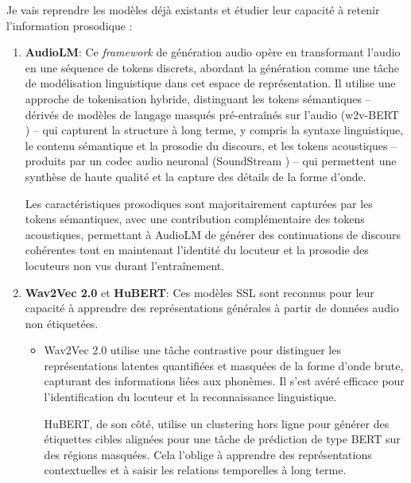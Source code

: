 \documentclass[11pt,a4paper]{article}
\begin{document}
Je vais reprendre les modèles déjà existants et étudier leur capacité à retenir l'information prosodique :
\begin{enumerate}
    \item \textbf{AudioLM}: Ce \textit{framework} de génération audio opère en transformant l'audio en une séquence de tokens discrets, abordant la génération comme une tâche de modélisation linguistique dans cet espace de représentation. Il utilise une approche de tokenisation hybride, distinguant les tokens sémantiques – dérivés de modèles de langage masqués pré-entraînés sur l'audio (w2v-BERT \cite{chung2021w2vbertcombiningcontrastivelearning}) – qui capturent la structure à long terme, y compris la syntaxe linguistique, le contenu sémantique et la prosodie du discours, et les tokens acoustiques – produits par un codec audio neuronal (SoundStream \cite{zeghidour2021soundstreamendtoendneuralaudio}) – qui permettent une synthèse de haute qualité et la capture des détails de la forme d'onde. \newline
    
    Les caractéristiques prosodiques sont majoritairement capturées par les tokens sémantiques, avec une contribution complémentaire des tokens acoustiques, permettant à AudioLM de générer des continuations de discours cohérentes tout en maintenant l'identité du locuteur et la prosodie des locuteurs non vus durant l'entraînement. \cite{borsos2023audiolmlanguagemodelingapproach} \newline

    \item \textbf{Wav2Vec 2.0} et \textbf{HuBERT}: Ces modèles SSL sont reconnus pour leur capacité à apprendre des représentations générales à partir de données audio non étiquetées.
    \begin{itemize}
        \item Wav2Vec 2.0 utilise une tâche contrastive pour distinguer les représentations latentes quantifiées et masquées de la forme d'onde brute, capturant des informations liées aux phonèmes. Il s'est avéré efficace pour l'identification du locuteur et la reconnaissance linguistique. \cite{fan2021exploringwav2vec20speaker} \newline

        HuBERT, de son côté, utilise un clustering hors ligne pour générer des étiquettes cibles alignées pour une tâche de prédiction de type BERT sur des régions masquées. Cela l'oblige à apprendre des représentations contextuelles et à saisir les relations temporelles à long terme. \cite{hsu2021hubertselfsupervisedspeechrepresentation} \newline
        

\end{itemize}
\end{enumerate}
\end{document}

